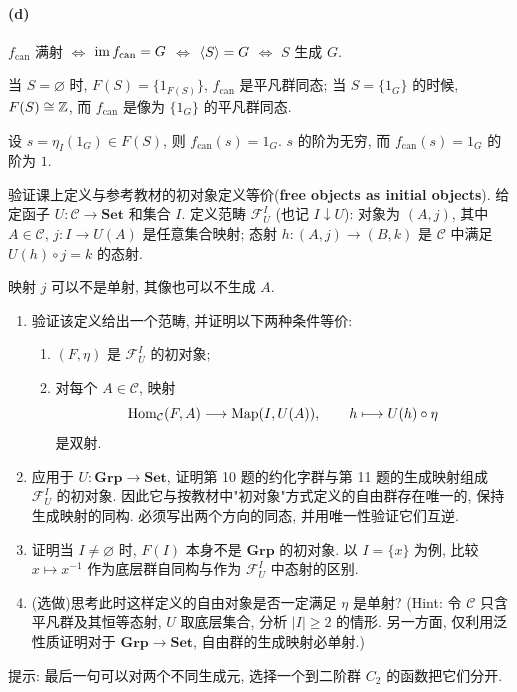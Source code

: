 \documentclass{article}
\begin{document}
\begin{solution}
	\paragraph{(d)} $f_{\mathrm{can}}$ 满射 $\Longleftrightarrow$ $\operatorname{im} f_{\mathrm{can}} = G$ $\Longleftrightarrow$ $\left\langle S \right\rangle = G$ $\Longleftrightarrow$ $S$ 生成 $G$. 
	
	当 $S = \varnothing$ 时, $F(S) = \{1_{F(S)}\}$, $f_{\mathrm{can}}$ 是平凡群同态; 当 $S = \{1_G\}$ 的时候, $F(S) \cong \mathbb{Z}$, 而 $f_{\mathrm{can}}$ 是像为 $\{1_{G}\}$ 的平凡群同态.

	设 $s = \eta_I(1_G) \in F(S)$, 则 $f_{\mathrm{can}}(s) = 1_G$. $s$ 的阶为无穷, 而 $f_{\mathrm{can}}(s) = 1_G$ 的阶为 $1$.
\end{solution}


\begin{problem}
  {\heiti 验证课上定义与参考教材的初对象定义等价}(\textbf{free objects as initial objects}). 给定函子 $U:\mathcal C\to\mathbf{Set}$ 和集合 $I$. 定义范畴 $\mathcal F_U^I$ (也记 $I\downarrow U$): 对象为 $(A,j)$, 其中 $A\in\mathcal C$, $j:I\to U(A)$ 是任意集合映射; 态射 $h:(A,j)\to(B,k)$ 是 $\mathcal C$ 中满足 $U(h)\circ j=k$ 的态射.

  映射 $j$ 可以不是单射, 其像也可以不生成 $A$.
  \begin{enumerate}
    \item[(a)] 验证该定义给出一个范畴, 并证明以下两种条件等价:
      \begin{enumerate}
        \item[(i)] $(F,\eta)$ 是 $\mathcal F_U^I$ 的初对象;
        \item[(ii)] 对每个 $A\in\mathcal C$, 映射
          \[
            \operatorname{Hom}_{\mathcal C}(F,A)\longrightarrow\operatorname{Map}(I,U(A)),
            \qquad h\longmapsto U(h)\circ\eta
          \]
          是双射.
      \end{enumerate}
    \item[(b)] 应用于 $U:\mathbf{Grp}\to\mathbf{Set}$, 证明第 10 题的约化字群与第 11 题的生成映射组成 $\mathcal F_U^I$ 的初对象. 因此它与按教材中"初对象"方式定义的自由群存在唯一的, 保持生成映射的同构. 必须写出两个方向的同态, 并用唯一性验证它们互逆.
    \item[(c)] 证明当 $I\neq\varnothing$ 时, $F(I)$ 本身不是 $\mathbf{Grp}$ 的初对象. 以 $I=\{x\}$ 为例, 比较 $x\mapsto x^{-1}$ 作为底层群自同构与作为 $\mathcal F_U^I$ 中态射的区别.
    \item[(d)] (选做)思考此时这样定义的自由对象是否一定满足 $\eta$ 是单射? (Hint: 令 $\mathcal C$ 只含平凡群及其恒等态射, $U$ 取底层集合, 分析 $|I|\geq2$ 的情形. 另一方面, 仅利用泛性质证明对于 $\mathbf{Grp}\to\mathbf{Set}$, 自由群的生成映射必单射.)
  \end{enumerate}
  提示: 最后一句可以对两个不同生成元, 选择一个到二阶群 $C_2$ 的函数把它们分开.
\end{problem}
\end{document}
